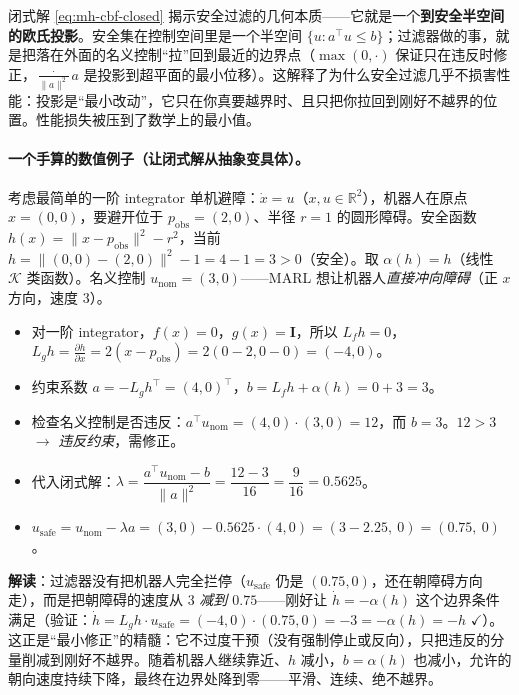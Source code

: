 \begin{insight}
闭式解 \cref{eq:mh-cbf-closed} 揭示安全过滤的几何本质——它就是一个\textbf{到安全半空间的欧氏投影}。安全集在控制空间里是一个半空间 $\{u:a^\top u\le b\}$；过滤器做的事，就是把落在外面的名义控制“拉”回到最近的边界点（$\max(0,\cdot)$ 保证只在违反时修正，$\frac{\cdot}{\|a\|^2}a$ 是投影到超平面的最小位移）。这解释了为什么安全过滤几乎不损害性能：投影是“最小改动”，它只在你真要越界时、且只把你拉回到刚好不越界的位置。性能损失被压到了数学上的最小值。
\end{insight}

\paragraph{一个手算的数值例子（让闭式解从抽象变具体）。}
考虑最简单的一阶 integrator 单机避障：$\dot x=u$（$x,u\in\mathbb{R}^2$），机器人在原点 $x=(0,0)$，要避开位于 $p_{\text{obs}}=(2,0)$、半径 $r=1$ 的圆形障碍。安全函数 $h(x)=\|x-p_{\text{obs}}\|^2-r^2$，当前 $h=\|(0,0)-(2,0)\|^2-1=4-1=3>0$（安全）。取 $\alpha(h)=h$（线性 $\mathcal{K}$ 类函数）。名义控制 $u_{\text{nom}}=(3,0)$——MARL 想让机器人\emph{直接冲向障碍}（正 $x$ 方向，速度 $3$）。
\begin{itemize}
  \item 对一阶 integrator，$f(x)=0$，$g(x)=\mathbf{I}$，所以 $L_fh=0$，$L_gh=\frac{\partial h}{\partial x}=2(x-p_{\text{obs}})=2(0-2,0-0)=(-4,0)$。
  \item 约束系数 $a=-L_gh^\top=(4,0)^\top$，$b=L_fh+\alpha(h)=0+3=3$。
  \item 检查名义控制是否违反：$a^\top u_{\text{nom}}=(4,0)\cdot(3,0)=12$，而 $b=3$。$12>3$ $\to$ \emph{违反约束}，需修正。
  \item 代入闭式解：$\lambda=\dfrac{a^\top u_{\text{nom}}-b}{\|a\|^2}=\dfrac{12-3}{16}=\dfrac{9}{16}=0.5625$。
  \item $u_{\text{safe}}=u_{\text{nom}}-\lambda a=(3,0)-0.5625\cdot(4,0)=(3-2.25,\ 0)=(0.75,\ 0)$。
\end{itemize}
\textbf{解读}：过滤器没有把机器人完全拦停（$u_{\text{safe}}$ 仍是 $(0.75,0)$，还在朝障碍方向走），而是把朝障碍的速度从 $3$ \emph{减到 $0.75$}——刚好让 $\dot h=-\alpha(h)$ 这个边界条件满足（验证：$\dot h=L_gh\cdot u_{\text{safe}}=(-4,0)\cdot(0.75,0)=-3=-\alpha(h)=-h$ $\checkmark$）。这正是“最小修正”的精髓：它不过度干预（没有强制停止或反向），只把违反的分量削减到刚好不越界。随着机器人继续靠近、$h$ 减小，$b=\alpha(h)$ 也减小，允许的朝向速度持续下降，最终在边界处降到零——平滑、连续、绝不越界。

